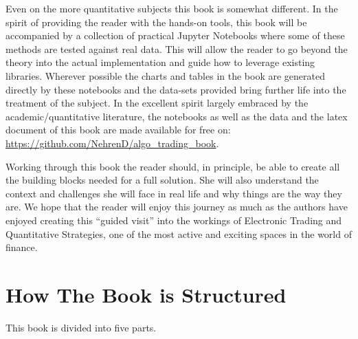 Even on the more quantitative subjects this book is somewhat different. In the spirit of providing the reader with the hands-on tools, this book will be accompanied by a collection of practical Jupyter Notebooks where some of these methods are tested against real data. This will allow the reader to go beyond the theory into the actual implementation and guide how to leverage existing libraries. Wherever possible the charts and tables in the book are generated directly by these notebooks and the data-sets provided bring further life into the treatment of the subject. In the excellent spirit largely embraced by the academic/quantitative literature, the notebooks as well as the data and the latex document of this book are made  available for free on: \url{https://github.com/NehrenD/algo_trading_book}.


Working through this book the reader should, in principle, be able to create all the building blocks needed for a full solution. She will also understand the context and challenges she will face in real life and why things are the way they are. We hope that the reader will enjoy this journey as much as the authors have enjoyed creating this ``guided visit'' into the workings of Electronic Trading and Quantitative Strategies, one of the most active and exciting spaces in the world of finance.



\section{How The Book is Structured}

This book is divided into five parts. 

